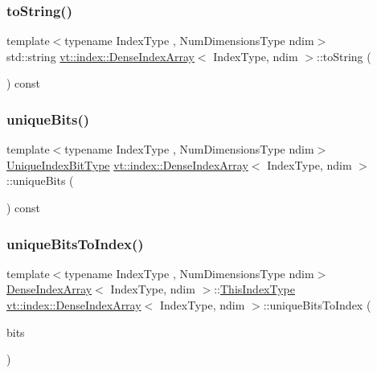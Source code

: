 \subsubsection{\texorpdfstring{to\+String()}{toString()}}
{\footnotesize\ttfamily template$<$typename Index\+Type , Num\+Dimensions\+Type ndim$>$ \\
std\+::string \hyperlink{structvt_1_1index_1_1_dense_index_array}{vt\+::index\+::\+Dense\+Index\+Array}$<$ Index\+Type, ndim $>$\+::to\+String (\begin{DoxyParamCaption}{ }\end{DoxyParamCaption}) const}

\mbox{\label{structvt_1_1index_1_1_dense_index_array_a41531f28f011127ee1714452dd4debef}} 
\subsubsection{\texorpdfstring{unique\+Bits()}{uniqueBits()}}
{\footnotesize\ttfamily template$<$typename Index\+Type , Num\+Dimensions\+Type ndim$>$ \\
\hyperlink{namespacevt_a913e1f07b5228dd8bb64040dc6dcea14}{Unique\+Index\+Bit\+Type} \hyperlink{structvt_1_1index_1_1_dense_index_array}{vt\+::index\+::\+Dense\+Index\+Array}$<$ Index\+Type, ndim $>$\+::unique\+Bits (\begin{DoxyParamCaption}{ }\end{DoxyParamCaption}) const}

\mbox{\label{structvt_1_1index_1_1_dense_index_array_ad9f18d4b0c0b5082c533286288c42529}} 
\subsubsection{\texorpdfstring{unique\+Bits\+To\+Index()}{uniqueBitsToIndex()}}
{\footnotesize\ttfamily template$<$typename Index\+Type , Num\+Dimensions\+Type ndim$>$ \\
\hyperlink{structvt_1_1index_1_1_dense_index_array}{Dense\+Index\+Array}$<$ Index\+Type, ndim $>$\+::\hyperlink{structvt_1_1index_1_1_dense_index_array_a6915511f6a82dff2522d6e8c2be20f2a}{This\+Index\+Type} \hyperlink{structvt_1_1index_1_1_dense_index_array}{vt\+::index\+::\+Dense\+Index\+Array}$<$ Index\+Type, ndim $>$\+::unique\+Bits\+To\+Index (\begin{DoxyParamCaption}\item[{\hyperlink{namespacevt_a913e1f07b5228dd8bb64040dc6dcea14}{Unique\+Index\+Bit\+Type} const \&}]{bits }\end{DoxyParamCaption})\hspace{0.3cm}{\ttfamily [static]}}

